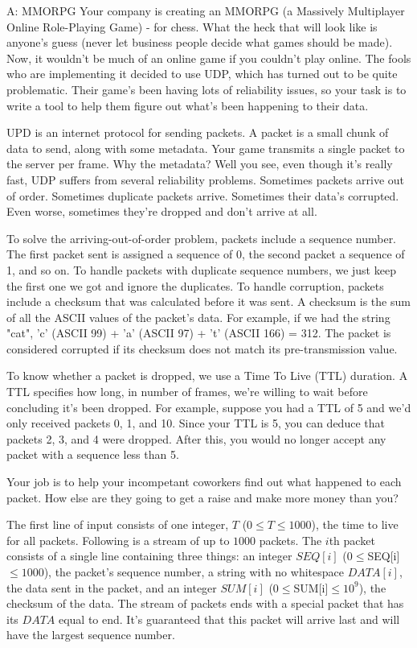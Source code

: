\begin{problem}{A: MMORPG}
Your company is creating an MMORPG (a Massively Multiplayer Online Role-Playing Game) - for chess. What the heck that will look like is anyone's guess (never let business people decide what games should be made). Now, it wouldn't be much of an online game if you couldn't play online. The fools who are implementing it decided to use UDP, which has turned out to be quite problematic. Their game's been having lots of reliability issues, so your task is to write a tool to help them figure out what's been happening to their data.

UPD is an internet protocol for sending packets. A packet is a small chunk of data to send, along with some metadata. Your game transmits a single packet to the server per frame. Why the metadata? Well you see, even though it's really fast, UDP suffers from several reliability problems. Sometimes packets arrive out of order. Sometimes duplicate packets arrive. Sometimes their data's corrupted. Even worse, sometimes they're dropped and don't arrive at all.

To solve the arriving-out-of-order problem, packets include a sequence number. The first packet sent is assigned a sequence of 0, the second packet a sequence of 1, and so on. To handle packets with duplicate sequence numbers, we just keep the first one we got and ignore the duplicates. To handle corruption, packets include a checksum that was calculated before it was sent. A checksum is the sum of all the ASCII values of the packet's data. For example, if we had the string "cat", 'c' (ASCII 99) + 'a' (ASCII 97) + 't' (ASCII 166) = 312. The packet is considered corrupted if its checksum does not match its pre-transmission value. 

To know whether a packet is dropped, we use a Time To Live (TTL) duration. A TTL specifies how long, in number of frames, we're willing to wait before concluding it's been dropped. For example, suppose you had a TTL of 5 and we'd only received packets 0, 1, and 10. Since your TTL is 5, you can deduce that packets 2, 3, and 4 were dropped. After this, you would no longer accept any packet with a sequence less than 5.

Your job is to help your incompetant coworkers find out what happened to each packet. How else are they going to get a raise and make more money than you?
\end{problem}

\begin{formalin}
The first line of input consists of one integer, $T$ ($0 \leq T \leq 1000$), the time to live for all packets. Following is a stream of up to $1000$ packets. The $i$th packet consists of a single line containing three things: an integer $SEQ[i]$ ($0 \leq $SEQ[i]$ \leq 1000$), the packet's sequence number, a string with no whitespace $DATA[i]$, the data sent in the packet, and an integer $SUM[i]$ ($0 \leq $SUM[i]$ \leq 10^{9}$), the checksum of the data. The stream of packets ends with a special packet that has its $DATA$ equal to end. It's guaranteed that this packet will arrive last and will have the largest sequence number.

\end{formalin}

